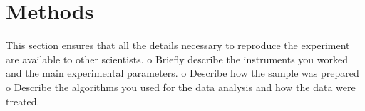 \chapter{Methods}

This section ensures that all the details necessary to reproduce the experiment are available to
other scientists.
o Briefly describe the instruments you worked and the main experimental parameters.
o Describe how the sample was prepared
o Describe the algorithms you used for the data analysis and how the data were treated. 